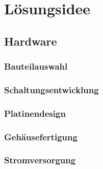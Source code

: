 \chapter{Lösungsidee}

\section{Hardware}

\subsection{Bauteilauswahl}

\subsection{Schaltungsentwicklung}

\subsection{Platinendesign}

\subsection{Gehäusefertigung}

\subsection{Stromversorgung}

